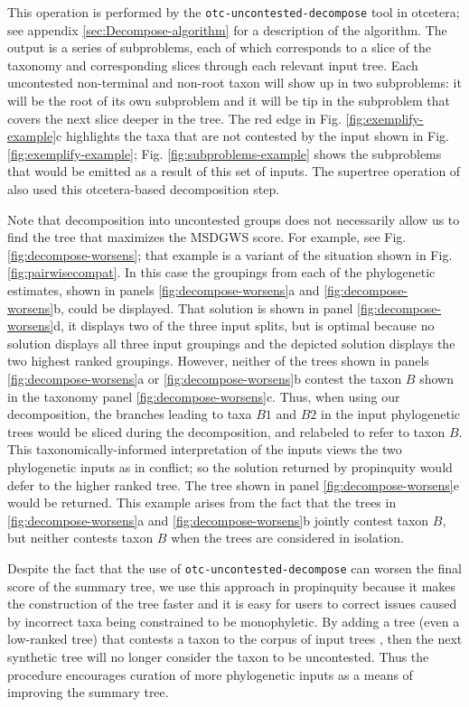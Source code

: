 \documentclass[fleqn,12pt,lineno,english]{wlpeerj}
\begin{document}
This operation is performed by the \texttt{otc-uncontested-decompose}
tool in otcetera; see appendix \ref{sec:Decompose-algorithm} for
a description of the algorithm. The output is a series of subproblems,
each of which corresponds to a slice of the taxonomy and corresponding
slices through each relevant input tree. Each uncontested non-terminal
and non-root taxon will show up in two subproblems: it will be the
root of its own subproblem and it will be tip in the subproblem that
covers the next slice deeper in the tree. The red edge in Fig. \ref{fig:exemplify-example}c
highlights the taxa that are not contested by the input shown in Fig. \ref{fig:exemplify-example};
Fig. \ref{fig:subproblems-example} shows the subproblems that would
be emitted as a result of this set of inputs. The supertree operation
of \citet{HinchliffEtAl2015} also used this otcetera-based decomposition
step.

Note that decomposition into uncontested groups does not necessarily
allow us to find the tree that maximizes the MSDGWS score. For example,
see Fig. \ref{fig:decompose-worsens}; that example is a variant
of the situation shown in Fig. \ref{fig:pairwisecompat}. In this
case the groupings from each of the phylogenetic estimates, shown
in panels \ref{fig:decompose-worsens}a and \ref{fig:decompose-worsens}b,
could be displayed. That solution is shown in panel \ref{fig:decompose-worsens}d,
it displays two of the three input splits, but is optimal because
no solution displays all three input groupings and the depicted solution
displays the two highest ranked groupings. However, neither of the
trees shown in panels \ref{fig:decompose-worsens}a or \ref{fig:decompose-worsens}b
contest the taxon $B$ shown in the taxonomy panel \ref{fig:decompose-worsens}c.
Thus, when using our decomposition, the branches leading to taxa $B1$
and $B2$ in the input phylogenetic trees would be sliced during the
decomposition, and relabeled to refer to taxon $B$. This taxonomically-informed
interpretation of the inputs views the two phylogenetic inputs as
in conflict; so the solution returned by propinquity would defer to
the higher ranked tree. The tree shown in panel \ref{fig:decompose-worsens}e
would be returned. This example arises from the fact that the trees
in \ref{fig:decompose-worsens}a and \ref{fig:decompose-worsens}b
jointly contest taxon $B$, but neither contests taxon $B$ when the
trees are considered in isolation.

Despite the fact that the use of \texttt{otc-uncontested-decompose}
can worsen the final score of the summary tree, we use this approach
in propinquity because it makes the construction of the tree faster
and it is easy for users to correct issues caused by incorrect taxa
being constrained to be monophyletic. By adding a tree (even a low-ranked
tree) that contests a taxon to the corpus of input trees , then the
next synthetic tree will no longer consider the taxon to be uncontested.
Thus the procedure encourages curation of more phylogenetic inputs
as a means of improving the summary tree. 
\end{document}
